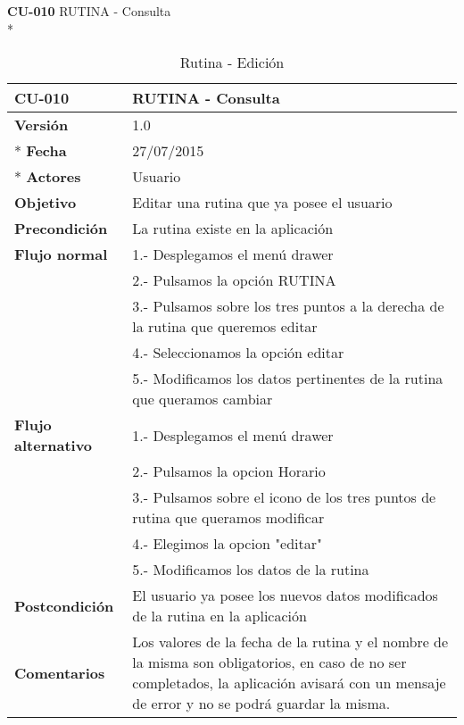 \documentclass[../pfc.tex]{subfiles}
\begin{document}
		
		
		
	\textbf{CU-010}	RUTINA - Consulta\\*
		
		\begin{table}[H]
			\centering
			\begin{tabular}[t]{|p{3cm}|p{9.5cm}|}
				\hline \textbf{CU-010} & \textbf{RUTINA - Consulta} \\*
				\hline\hline \textbf{Versión} & 1.0 \\ *
				\hline\hline \textbf{Fecha} & 27/07/2015 \\ *
				\hline\textbf{Actores} 	& Usuario\\*
				\hline \textbf{Objetivo} & Editar una rutina que ya posee el usuario\\* 			
				\hline \textbf{Precondición} & La rutina existe en la aplicación\\* 
				\hline \textbf{Flujo normal} & 1.- Desplegamos el menú drawer \\* 
				& 2.- Pulsamos la opción RUTINA\\*	
				& 3.- Pulsamos sobre los tres puntos a la derecha de la rutina que queremos editar\\*	
				& 4.- Seleccionamos la opción editar\\*	
				& 5.- Modificamos los datos pertinentes de la rutina que queramos cambiar\\*	
				\hline \textbf{Flujo alternativo} & 1.- Desplegamos el menú drawer \\* 
				& 2.- Pulsamos la opcion Horario \\*	
				& 3.- Pulsamos sobre el icono de los tres puntos de rutina que queramos modificar \\*	
				& 4.- Elegimos la opcion "editar"\\*	
				& 5.- Modificamos los datos de la rutina\\*	
				\hline \textbf{Postcondición} & El usuario ya posee los nuevos datos modificados de la rutina en la aplicación \\* 
				\hline \textbf{Comentarios}   & Los valores de la fecha de la rutina y el nombre de la misma son obligatorios, en caso de no ser completados, la aplicación avisará con un mensaje de error y no se podrá guardar la misma.\\*
				\hline
			\end{tabular}
			\caption{Rutina - Edición}
			\label{tabla:caso010}
		\end{table}
		
		
		
\end{document}
